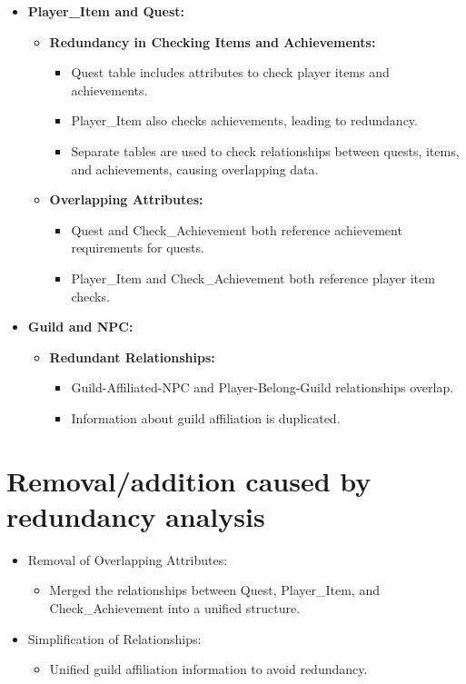 \documentclass{article}
\begin{document}
\begin{itemize}
    \item \textbf{Player\_Item and Quest:}
    \begin{itemize}
        \item \textbf{Redundancy in Checking Items and Achievements:}
        \begin{itemize}
            \item Quest table includes attributes to check player items and achievements.
            \item Player\_Item also checks achievements, leading to redundancy.
            \item Separate tables are used to check relationships between quests, items, and achievements, causing overlapping data.
        \end{itemize}
        \item \textbf{Overlapping Attributes:}
        \begin{itemize}
            \item Quest and Check\_Achievement both reference achievement requirements for quests.
            \item Player\_Item and Check\_Achievement both reference player item checks.
        \end{itemize}
    \end{itemize}
    \item \textbf{Guild and NPC:}
    \begin{itemize}
        \item \textbf{Redundant Relationships:}
        \begin{itemize}
            \item Guild-Affiliated-NPC and Player-Belong-Guild relationships overlap.
            \item Information about guild affiliation is duplicated.
        \end{itemize}
    \end{itemize}
\end{itemize}

\section{Removal/addition caused by redundancy analysis}

\begin{itemize}
    \item Removal of Overlapping Attributes:
    \begin{itemize}
        \item Merged the relationships between Quest, Player\_Item, and Check\_Achievement into a unified structure.
    \end{itemize}
    \item Simplification of Relationships:
    \begin{itemize}
        \item Unified guild affiliation information to avoid redundancy.
    \end{itemize}
\end{itemize}
\end{document}

